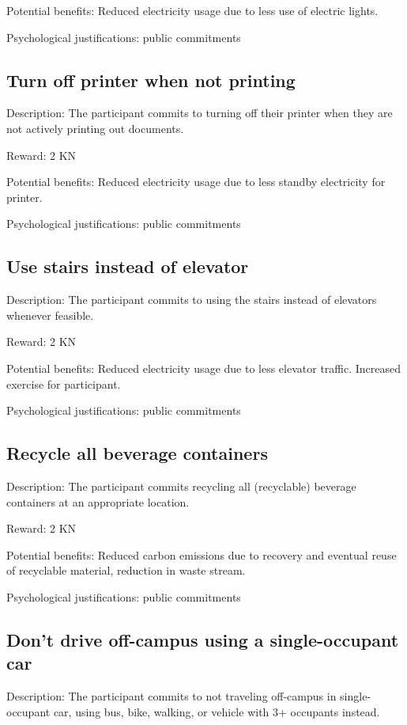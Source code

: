 Potential benefits: Reduced electricity usage due to less use of electric lights.

Psychological justifications: public commitments

\subsection{Turn off printer when not printing}

Description: The participant commits to turning off their printer when they are not actively printing out documents.

Reward: 2 KN

Potential benefits: Reduced electricity usage due to less standby electricity for printer.

Psychological justifications: public commitments

\subsection{Use stairs instead of elevator}

Description: The participant commits to using the stairs instead of elevators whenever feasible.

Reward: 2 KN

Potential benefits: Reduced electricity usage due to less elevator traffic. Increased exercise for participant.

Psychological justifications: public commitments

\subsection{Recycle all beverage containers}

Description: The participant commits recycling all (recyclable) beverage containers at an appropriate location.

Reward: 2 KN

Potential benefits: Reduced carbon emissions due to recovery and eventual reuse of recyclable material, reduction in waste stream.

Psychological justifications: public commitments

\subsection{Don't drive off-campus using a single-occupant car}

Description: The participant commits to not traveling off-campus in single-occupant car, using bus, bike, walking, or vehicle with 3+ occupants instead.

